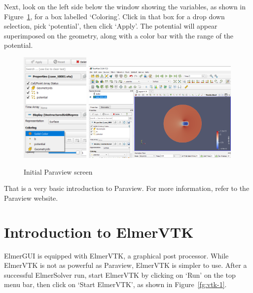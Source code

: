 \newpage

Next, look on the left side below the window showing the variables, as shown in Figure~\ref{fg:paraview-5}, for a box labelled `Coloring'.  Click in that box for a drop down selection, pick `potential', then click `Apply'.  The potential will appear superimposed on the geometry, along with a color bar with the range of the potential.

\begin{figure}[H]
\begin{center}
\includegraphics[width=0.3\textwidth]{paraview-5}
\includegraphics[width=0.68\textwidth]{paraview-6}
\caption{Initial Paraview screen}\label{fg:paraview-5}
\end{center}
\end{figure}

That is a very basic introduction to Paraview.  For more information, refer to the  Paraview website.


\chapter{Introduction to ElmerVTK}

ElmerGUI is equipped with ElmerVTK, a graphical post processor.  While ElmerVTK is not as powerful as Paraview, ElmerVTK is simpler to use.  After a successful ElmerSolver run, start ElmerVTK by clicking on `Run' on the top menu bar, then click on `Start ElmerVTK',  as shown in Figure~\ref{fg:vtk-1}.

